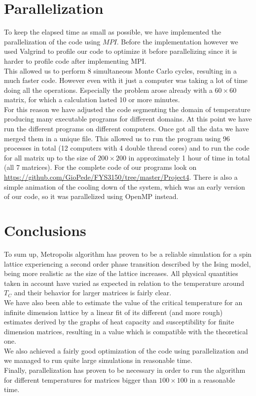 \documentclass[10pt,a4paper,titlepage]{article}
\begin{document}
\section*{Parallelization}
\noindent To keep the elapsed time as small as possible, we have implemented the parallelization of the code using $MPI$. Before the implementation however we used Valgrind to profile our code to optimize it before parallelizing since it is harder to profile code after implementing MPI.\\
This allowed us to perform 8 simultaneous Monte Carlo cycles, resulting in a much faster code. However  even with it just a computer was taking a lot of time doing all the operations. Especially the problem arose already with a $60 \times 60$ matrix, for which a calculation lasted 10 or more minutes. \\
For this reason we have adjusted the code segmenting the domain of temperature producing many executable programs for different domains. At this point we have run the different programs on different computers. Once got all the data we have merged them in a unique file. This allowed us to run the program using 96 processes in total (12 computers with 4 double thread cores) and to run the code for all matrix up to the size of $200 \times 200$ in approximately 1 hour of time in total (all 7 matrices). For the complete code of our programs look on \url{https://github.com/GioPede/FYS3150/tree/master/Project4}. There is also a simple animation of the cooling down of the system, which was an early version of our code, so it was parallelized using OpenMP instead.
\section*{Conclusions}
\noindent To sum up, Metropolis algorithm has proven to be a reliable simulation for a spin lattice experiencing a second order phase transition described by the Ising model, being more realistic as the size of the lattice increases. All physical quantities taken in account have varied as expected in relation to the temperature around $T_{C}$ and their behavior for larger matrices is fairly clear.  
\\We have also been able to estimate the value of the critical temperature for an infinite dimension lattice by a linear fit of its different (and more rough) estimates derived by the graphs of heat capacity and susceptibility for finite dimension matrices, resulting in a value which is compatible with the theoretical one. \\ 
We also achieved a fairly good optimization of the code using parallelization and we managed to run quite large simulations in reasonable time.
\\Finally, parallelization has proven to be necessary in order to run the algorithm for different temperatures for matrices bigger than $100 \times 100$ in a reasonable time.
\end{document}
